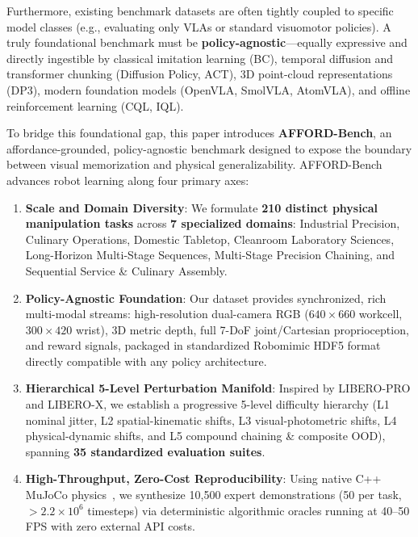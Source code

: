 \documentclass[conference]{IEEEtran}
\begin{document}
Furthermore, existing benchmark datasets are often tightly coupled to specific model classes (e.g., evaluating only VLAs or standard visuomotor policies). A truly foundational benchmark must be \textbf{policy-agnostic}---equally expressive and directly ingestible by classical imitation learning (BC), temporal diffusion and transformer chunking (Diffusion Policy, ACT), 3D point-cloud representations (DP3), modern foundation models (OpenVLA, SmolVLA, AtomVLA), and offline reinforcement learning (CQL, IQL).

To bridge this foundational gap, this paper introduces \textbf{AFFORD-Bench}, an affordance-grounded, policy-agnostic benchmark designed to expose the boundary between visual memorization and physical generalizability. AFFORD-Bench advances robot learning along four primary axes:
\begin{enumerate}
    \item \textbf{Scale and Domain Diversity}: We formulate \textbf{210 distinct physical manipulation tasks} across \textbf{7 specialized domains}: Industrial Precision, Culinary Operations, Domestic Tabletop, Cleanroom Laboratory Sciences, Long-Horizon Multi-Stage Sequences, Multi-Stage Precision Chaining, and Sequential Service \& Culinary Assembly.
    \item \textbf{Policy-Agnostic Foundation}: Our dataset provides synchronized, rich multi-modal streams: high-resolution dual-camera RGB ($640\times 660$ workcell, $300\times 420$ wrist), 3D metric depth, full 7-DoF joint/Cartesian proprioception, and reward signals, packaged in standardized Robomimic HDF5 format directly compatible with any policy architecture.
    \item \textbf{Hierarchical 5-Level Perturbation Manifold}: Inspired by LIBERO-PRO and LIBERO-X, we establish a progressive 5-level difficulty hierarchy (L1 nominal jitter, L2 spatial-kinematic shifts, L3 visual-photometric shifts, L4 physical-dynamic shifts, and L5 compound chaining \& composite OOD), spanning \textbf{35 standardized evaluation suites}.
    \item \textbf{High-Throughput, Zero-Cost Reproducibility}: Using native C++ MuJoCo physics~\cite{todorov2012mujoco}, we synthesize 10,500 expert demonstrations (50 per task, $>2.2\times 10^6$ timesteps) via deterministic algorithmic oracles running at 40--50 FPS with zero external API costs.
\end{enumerate}
\end{document}
